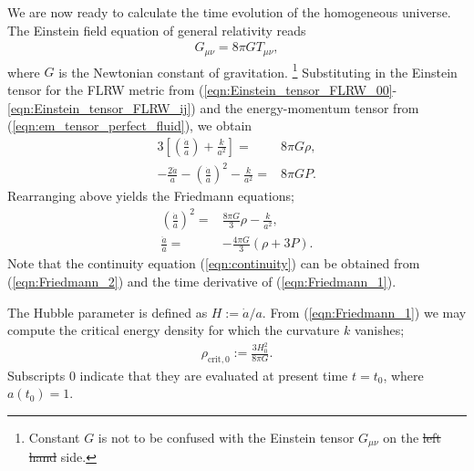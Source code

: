 \documentclass[a4paper,12pt,times,custombib,print,index]{Classes/PhDThesisPSnPDF} %
\providecommand{\DIFadd}[1]{{\protect\color{blue}\uwave{#1}}} %
\providecommand{\DIFdel}[1]{{\protect\color{red}\sout{#1}}}                      %
\providecommand{\DIFaddbegin}{} %
\providecommand{\DIFaddend}{} %
\providecommand{\DIFdelbegin}{} %
\providecommand{\DIFdelend}{} %
\newcommand{\DIFscaledelfig}{0.5}
\newlength{\DIFdelgraphicswidth} %
\newlength{\DIFdelgraphicsheight} %
\newcommand{\DIFaddincludegraphics}[2][]{{\color{blue}\fbox{\DIFOincludegraphics[#1]{#2}}}} %
\newcommand{\DIFdelincludegraphics}[2][]{%
\sbox{\DIFdelgraphicsbox}{\DIFOincludegraphics[#1]{#2}}%
\settoboxwidth{\DIFdelgraphicswidth}{\DIFdelgraphicsbox} %
\settoboxtotalheight{\DIFdelgraphicsheight}{\DIFdelgraphicsbox} %
\scalebox{\DIFscaledelfig}{%
\parbox[b]{\DIFdelgraphicswidth}{\usebox{\DIFdelgraphicsbox}\\[-\baselineskip] \rule{\DIFdelgraphicswidth}{0em}}\llap{\resizebox{\DIFdelgraphicswidth}{\DIFdelgraphicsheight}{%
\setlength{\unitlength}{\DIFdelgraphicswidth}%
\begin{picture}(1,1)%
\thicklines\linethickness{2pt} %
{\color[rgb]{1,0,0}\put(0,0){\framebox(1,1){}}}%
{\color[rgb]{1,0,0}\put(0,0){\line( 1,1){1}}}%
{\color[rgb]{1,0,0}\put(0,1){\line(1,-1){1}}}%
\end{picture}%
}\hspace*{3pt}}} %
} %
\DeclareRobustCommand{\DIFaddbegin}{\DIFOaddbegin \let\includegraphics\DIFaddincludegraphics} %
\DeclareRobustCommand{\DIFaddend}{\DIFOaddend \let\includegraphics\DIFOincludegraphics} %
\DeclareRobustCommand{\DIFdelbegin}{\DIFOdelbegin \let\includegraphics\DIFdelincludegraphics} %
\DeclareRobustCommand{\DIFdelend}{\DIFOaddend \let\includegraphics\DIFOincludegraphics} %
\begin{document}
We are now ready to calculate the time evolution of the homogeneous universe. The Einstein field equation of general relativity reads
\begin{align}
	G_{\mu\nu} = 8\pi G T_{\mu\nu},
\end{align}
where $G$ is the Newtonian constant of gravitation. \footnote{Constant $G$ is not to be confused with the Einstein tensor $G_{\mu\nu}$ on the \DIFdelbegin \DIFdel{left hand }\DIFdelend \DIFaddbegin \DIFadd{left-hand }\DIFaddend side.} Substituting in the Einstein tensor for the FLRW metric from (\ref{eqn:Einstein_tensor_FLRW_00}-\ref{eqn:Einstein_tensor_FLRW_ij}) and the energy-momentum tensor from (\ref{eqn:em_tensor_perfect_fluid}), we obtain
\begin{align}
	3 \left[ \left(\frac{\dot{a}}{a}\right) + \frac{k}{a^2} \right] =& 8\pi G \rho, \\
	-\frac{2\ddot{a}}{a} - \left(\frac{\dot{a}}{a}\right)^2 - \frac{k}{a^2} =& 8\pi G P.
\end{align}
Rearranging above yields the Friedmann equations;
\begin{align}
	\left(\frac{\dot{a}}{a}\right)^2 =& \frac{8\pi G}{3}\rho - \frac{k}{a^2}, \label{eqn:Friedmann_1}\\
	\frac{\ddot{a}}{a} =& - \frac{4\pi G}{3} \left(\rho + 3P\right). \label{eqn:Friedmann_2}
\end{align}
Note that the continuity equation (\ref{eqn:continuity}) can be obtained from (\ref{eqn:Friedmann_2}) and the time derivative of (\ref{eqn:Friedmann_1}).

The Hubble parameter is defined as $H := \dot{a}/a$. From (\ref{eqn:Friedmann_1}) we may compute the critical energy density for which the curvature $k$ vanishes;
\begin{align}
	\rho_{\text{crit},0} := \frac{3H_0^2}{8\pi G}.
\end{align}
Subscripts $0$ indicate that they are evaluated at present time $t=t_0$, where $a(t_0)=1$.
\end{document}
